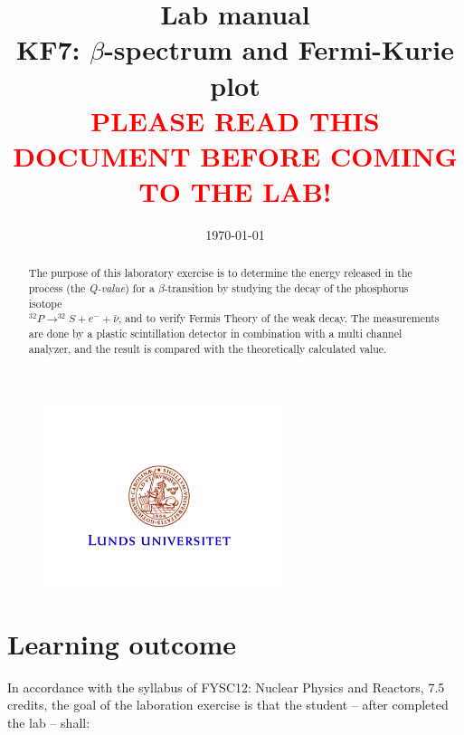\documentclass[a4,11pt, notitlepage]{article}
\begin{document}
 
 

\title{\huge{Lab manual
\\KF7: $\beta$-spectrum and Fermi-Kurie plot
\vspace{1cm}
\\\textcolor{red}{PLEASE READ THIS DOCUMENT BEFORE COMING TO THE LAB!}}}
\date{\today}
\maketitle

\vspace{10pt}
\begin{abstract}
The purpose of this laboratory exercise is to determine the energy released in the process (the \textit{Q-value}) for a $\beta$-transition by studying the decay of the phosphorus isotope 
\\$^{32}P\rightarrow ^{32}S + e^- + \bar{\nu}$, and to verify Fermis Theory of the weak decay. The measurements are done by a plastic scintillation detector in combination with a multi channel analyzer, and the result is compared with the theoretically calculated value. 
\end{abstract}

\begin{figure}[htp]
  \vspace{40pt}
  \begin{center}
    \includegraphics[width=7.0cm]{figures/LU.png}
  \end{center}
\end{figure}

\thispagestyle{empty}

\pagebreak
\tableofcontents 
\pagebreak
\section{Learning outcome}

In accordance with the syllabus of FYSC12: Nuclear Physics and Reactors, 7.5
credits, the goal of the laboration exercise is that the student -- after
completed the lab -- shall:
\end{document}
